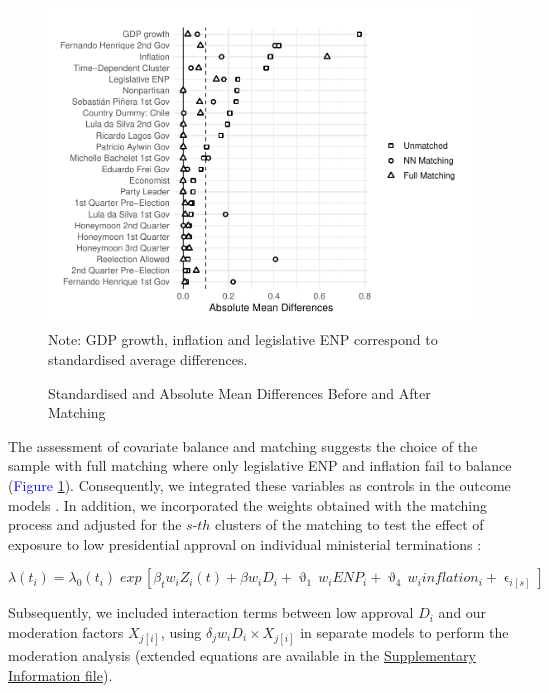 \documentclass[12pt,halfline,a4paper]{ouparticle}
\begin{document}
\begin{figure}[ht]
\caption{Standardised and Absolute Mean Differences Before and After Matching}
\label{FIG2}
\centering \vspace{2mm}
\includegraphics[width=0.99\linewidth]{figures/loveplot.pdf} \\ \vspace{2mm}
{\footnotesize Note: GDP growth, inflation and legislative ENP correspond to standardised average differences.}
\end{figure}

The assessment of covariate balance and matching suggests the choice of the sample with full matching where only legislative ENP and inflation fail to balance (\textcolor{blue}{Figure} \ref{FIG2}). Consequently, we integrated these variables as controls in the outcome models \citep{Austin2007, Olmos2015}. In addition, we incorporated the weights obtained with the matching process and adjusted for the $s$-$th$ clusters of the matching to test the effect of exposure to low presidential approval on individual ministerial terminations \citep{Austin2015, Ho2011}:

\begin{equation} \label{EQ3} 
\lambda(t_{i}) = \lambda_{0}(t_{i}) \; exp \, \left[ \beta_{t}w_{i}Z_{i}(t) + \beta w_{i}D_{i} + \upvartheta_{1} \, w_{i}ENP_{i} + \upvartheta_{4} \, w_{i}inflation_{i} + \upvarepsilon_{i[s]} \right]
\end{equation}

Subsequently, we included interaction terms between low approval $D_{i}$ and our moderation factors $X_{j[i]}$, using $\delta_{j} w_{i} D_{i} \times X_{j[i]}$ in separate models to perform the moderation analysis (extended equations are available in the \href{https://osf.io/asgbj/?view_only=144acd6c8eca4836880b57dee85ea4ff}{Supplementary Information file}).
\end{document}
